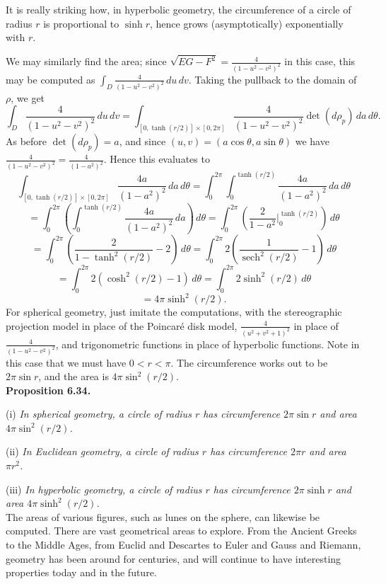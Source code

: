 \documentclass[leqno]{book}
\begin{document}
It is really striking how, in hyperbolic geometry, the circumference of a circle of radius $r$ is proportional to $\sinh r$, hence grows (asymptotically) exponentially with $r$.

We may similarly find the area; since $\sqrt{EG-F^2}=\frac 4{(1-u^2-v^2)^2}$ in this case, this may be computed as $\int_D\frac 4{(1-u^2-v^2)^2}\,du\,dv$.  Taking the pullback to the domain of $\rho$, we get
$$\int_D\frac 4{(1-u^2-v^2)^2}\,du\,dv=\int_{[0,\tanh(r/2)]\times[0,2\pi]}\frac 4{(1-u^2-v^2)^2}\det(d\rho_p)\,da\,d\theta.$$
As before $\det(d\rho_p)=a$, and since $(u,v)=(a\cos\theta,a\sin\theta)$ we have $\frac 4{(1-u^2-v^2)^2}=\frac 4{(1-a^2)^2}$.  Hence this evaluates to
$$\int_{[0,\tanh(r/2)]\times[0,2\pi]}\frac{4a}{(1-a^2)^2}\,da\,d\theta=\int_0^{2\pi}\int_0^{\tanh(r/2)}\frac{4a}{(1-a^2)^2}\,da\,d\theta$$
$$=\int_0^{2\pi}\left(\int_0^{\tanh(r/2)}\frac{4a}{(1-a^2)^2}\,da\right)\,d\theta=\int_0^{2\pi}\left(\frac 2{1-a^2}\big|_0^{\tanh(r/2)}\right)\,d\theta$$
$$=\int_0^{2\pi}\left(\frac 2{1-\tanh^2(r/2)}-2\right)\,d\theta=\int_0^{2\pi}2\left(\frac 1{\operatorname{sech}^2(r/2)}-1\right)\,d\theta$$
$$=\int_0^{2\pi}2\left(\cosh^2(r/2)-1\right)\,d\theta=\int_0^{2\pi}2\sinh^2(r/2)\,d\theta$$
$$=4\pi\sinh^2(r/2).$$
For spherical geometry, just imitate the computations, with the stereographic projection model in place of the Poincar\'e disk model, $\frac 4{(u^2+v^2+1)^2}$ in place of $\frac 4{(1-u^2-v^2)^2}$, and trigonometric functions in place of hyperbolic functions.  Note in this case that we must have $0<r<\pi$.  The circumference works out to be $2\pi\sin r$, and the area is $4\pi\sin^2(r/2)$.\\

\noindent\textbf{Proposition 6.34.}

(i) \emph{In spherical geometry, a circle of radius $r$ has circumference $2\pi\sin r$ and area $4\pi\sin^2(r/2)$.}

(ii) \emph{In Euclidean geometry, a circle of radius $r$ has circumference $2\pi r$ and area $\pi r^2$.}

(iii) \emph{In hyperbolic geometry, a circle of radius $r$ has circumference $2\pi\sinh r$ and area $4\pi\sinh^2(r/2)$.}\\

\noindent The areas of various figures, such as lunes on the sphere, can likewise be computed.  There are vast geometrical areas to explore.  From the Ancient Greeks to the Middle Ages, from Euclid and Descartes to Euler and Gauss and Riemann, geometry has been around for centuries, and will continue to have interesting properties today and in the future.
\end{document}
